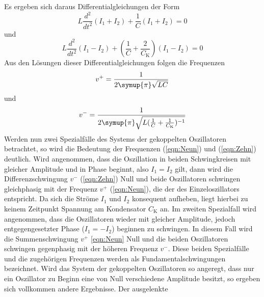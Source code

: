 Es ergeben sich daraus Differentialgleichungen der Form
\begin{equation}
    L \frac{d^2}{dt^2}(I_1 + I_2) + \frac{1}{C}(I_1 +I_2) = 0
    \label{eqn:Sieben}
\end{equation}
und
\begin{equation}
    L \frac{d^2}{dt^2}(I_1 - I_2) + ( \frac{1}{C} + \frac{2}{C_{\text{K}}} ) (I_1 - I_2) = 0
    \label{eqn:Acht}
\end{equation}
Aus den Lösungen dieser Differentialgleichungen folgen die Frequenzen
\begin{equation}
    v^{+} = \frac{1}{ 2\symup{\pi} \sqrt{L C}}
    \label{eqn:Neun}
\end{equation}
und
\begin{equation}
    v^{-} = \frac{1}{ 2\symup{\pi} \sqrt{L (\frac{1}{C} + \frac{1}{C_{\text{K}}})^{-1}}}
    \label{eqn:Zehn}
\end{equation}
\newline
Werden nun zwei Spezialfälle des Systems der gekoppelten Oszillatoren betrachtet, so wird die Bedeutung der Frequenzen (\ref {eqn:Neun}) und (\ref {eqn:Zehn}) deutlich.
\newline
Wird angenommen, dass die Oszillation in beiden Schwingkreisen mit gleicher Amplitude und in Phase beginnt, also $ I_1 = I_2 $ gilt, dann wird die Differenzschwingung $ v^{-} $ (\ref {eqn:Zehn})
Null und beide Oszillatoren schwingen gleichphasig mit der Frequenz $ v^{+} $ (\ref {eqn:Neun}), die der des Einzeloszillators entspricht. Da sich die Ströme $ I_1 $ und $ I_2 $ konsequent
aufheben, liegt hierbei zu keinem Zeitpunkt Spannung am Kondensator $ C_{\text{K}} $ an.
\newline
Im zweiten Spezialfall wird angenommen, dass die Oszillatoren wieder mit gleicher Amplitude, jedoch entgegengesetzter Phase ($ I_1 = -I_2 $) beginnen zu schwingen. In diesem Fall
wird die Summenschwingung $ v^{+} $ \ref {eqn:Neun} Null und die beiden Oszillatoren schwingen gegenphasig mit der höheren Frequenz $ v^{-} $.
\newline
Diese beiden Spezialfälle und die zugehörigen Frequenzen werden als Fundamentalschwingungen bezeichnet.
\newline
Wird das System der gekoppelten Oszillatoren so angeregt, dass nur ein Oszillator zu Beginn eine von Null verschiedene Amplitude besitzt, so ergeben sich vollkommen andere Ergebnisse. Der ausgelenkte
